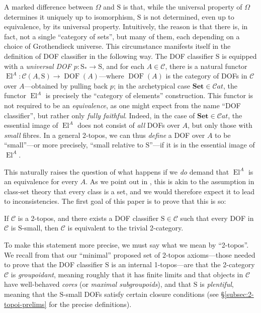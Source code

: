 \documentclass{amsart}
\newcommand\Cat{\mathcal{C}at}
\newcommand\cC{\mathcal{C}}
\newcommand\DOF{\operatorname{DOF}}
\newcommand\El{\operatorname{El}}
\newcommand\rS{\mathrm{S}}
\newcommand\Set{\mathbf{Set}}
\newcommand\prerefpost[3]{%
  \texorpdfstring%
    {\hyperref[#2]{#1\ref*{#2}#3}}%
    {#1\ref*{#2}#3}%
}
\newcommand\sref[1]{\prerefpost{\S}{#1}{}}
\theoremstyle{definition}
\theoremstyle{remark}
\theoremstyle{plainwithref}
\begin{document}
A marked difference between \( \Omega \) and \( \rS \) is that, while the universal property of \( \Omega \) determines it uniquely up to isomorphism, \( \rS \) is not determined, even up to equivalence, by its universal property.
Intuitively, the reason is that there is, in fact, not a single ``category of sets'', but many of them, each depending on a choice of Grothendieck universe.
This circumstance manifests itself in the definition of DOF classifier in the following way.
The DOF classifier \( \rS \) is equipped with a \emph{universal DOF} \( p \colon \rS_* \to \rS \), and for each \( A \in \cC \), there is a natural functor \( \El^A \colon \cC(A,\rS) \to \DOF(A) \)---where \( \DOF(A) \) is the category of DOFs in \( \cC \) over \( A \)---obtained by pulling back \( p \); in the archetypical case \( \Set \in \Cat \), the functor \( \El^A \) is precisely the ``category of elements'' construction.
This functor is not required to be an \emph{equivalence}, as one might expect from the name ``DOF classifier'', but rather only \emph{fully faithful}.
Indeed, in the case of \( \Set \in \Cat \), the essential image of \( \El^A \) does not consist of \emph{all} DOFs over \( A \), but only those with \emph{small} fibres.
In a general 2-topos, we can thus \emph{define} a DOF over \( A \) to be ``small''---or more precisely, ``small relative to \( \rS \)''---if it is in the essential image of \( \El^A \).

This naturally raises the question of what happens if we \emph{do} demand that \( \El^A \) is an equivalence for every \( A \).
As we point out in \cite{helfer-topoi-in-topoi}, this is akin to the assumption in class-set theory that every class is a set, and we would therefore expect it to lead to inconsistencies.
The first goal of this paper is to prove that this is so:
{
  \renewcommand\thedefn{A}
  \begin{thm}[paraphrased]
    If \( \cC \) is a 2-topos, and there exists a DOF classifier \( \rS \in \cC \) such that every DOF in \( \cC \) is \( \rS \)-small, then \( \cC \) is equivalent to the trivial 2-category.
  \end{thm}
}

To make this statement more precise, we must say what we mean by ``2-topos''.
We recall from \cite{helfer-topoi-in-topoi} that our ``minimal'' proposed set of 2-topos axioms---those needed to prove that the DOF classifier \( \rS \) is an internal 1-topos---are that the 2-category \( \cC \) is \emph{groupoidant}, meaning roughly that it has finite limits and that objects in \( \cC \) have well-behaved \emph{cores} (or \emph{maximal subgroupoids}), and that \( \rS \) is \emph{plentiful}, meaning that the \( \rS \)-small DOFs satisfy certain closure conditions (see \sref{subsec:2-topoi-prelims} for the precise definitions).
\end{document}

